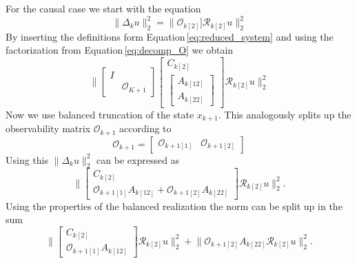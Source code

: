 \documentclass[numbers=noenddot,doctype=mastersthesis,BCOR=15mm,biblatex]{ldvbook}%
\newcommand{\R}{\mathcal{R}} %
\newcommand{\Ob}{\mathcal{O}} %
\newcommand{\eye}{I} %
\begin{document}
For the causal case we start with the equation
\begin{equation}
	\|\Delta_k u\|_2^2 = \|\Ob_{k[2]}] \R_{k[2]} u\|_2^2
\end{equation}
By inserting the definitions form Equation\,\ref{eq:reduced_system} and using the factorization from Equation\,\ref{eq:decomp_O} we obtain 
\begin{equation}
	\Bigg\|
	\begin{bmatrix}
	\eye & \\
	& \Ob_{K+1}
	\end{bmatrix}
	\begin{bmatrix}
	C_{k[2]}\\
	\begin{bmatrix}
	A_{k[12]}\\
	A_{k[22]}
	\end{bmatrix}
	\end{bmatrix}  \R_{k[2]} u\Bigg\|_2^2
\end{equation}
Now we use balanced truncation of the state $x_{k+1}$.
This analogously splits up the observability matrix $\Ob_{k+1}$ according to
\begin{equation}
	\Ob_{k+1} = 
	\begin{bmatrix}
	\Ob_{k+1[1]} & \Ob_{k+1[2]}
	\end{bmatrix}
\end{equation}
Using this $\|\Delta_k u\|_2^2$ can be expressed as
\begin{equation}
	\Bigg\|
\begin{bmatrix}
C_{k[2]}\\
\Ob_{k+1[1]}A_{k[12]}+
\Ob_{k+1[2]}A_{k[22]}
\end{bmatrix}  \R_{k[2]} u\Bigg\|_2^2
.
\end{equation}
Using the properties of the balanced realization the norm can be split up in the sum
\begin{equation}
\Big\|
\begin{bmatrix}
C_{k[2]}\\
\Ob_{k+1[1]}A_{k[12]}
\end{bmatrix}  \R_{k[2]} u
\Big\|_2^2
+
\Big\|
\Ob_{k+1[2]}A_{k[22]}
 \R_{k[2]} u
\Big\|_2^2
.
\end{equation}
\end{document}
